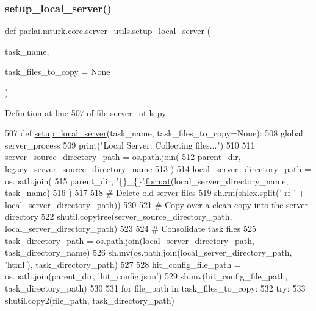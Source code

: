 \subsubsection{\texorpdfstring{setup\+\_\+local\+\_\+server()}{setup\_local\_server()}}
{\footnotesize\ttfamily def parlai.\+mturk.\+core.\+server\+\_\+utils.\+setup\+\_\+local\+\_\+server (\begin{DoxyParamCaption}\item[{}]{task\+\_\+name,  }\item[{}]{task\+\_\+files\+\_\+to\+\_\+copy = {\ttfamily None} }\end{DoxyParamCaption})}



Definition at line 507 of file server\+\_\+utils.\+py.


\begin{DoxyCode}
507 \textcolor{keyword}{def }\hyperlink{namespaceparlai_1_1mturk_1_1core_1_1server__utils_a9d4c4937ea60bd74630a44739e825ebf}{setup\_local\_server}(task\_name, task\_files\_to\_copy=None):
508     \textcolor{keyword}{global} server\_process
509     print(\textcolor{stringliteral}{"Local Server: Collecting files..."})
510 
511     server\_source\_directory\_path = os.path.join(
512         parent\_dir, legacy\_server\_source\_directory\_name
513     )
514     local\_server\_directory\_path = os.path.join(
515         parent\_dir, \textcolor{stringliteral}{'\{\}\_\{\}'}.\hyperlink{namespaceparlai_1_1chat__service_1_1services_1_1messenger_1_1shared__utils_a32e2e2022b824fbaf80c747160b52a76}{format}(local\_server\_directory\_name, task\_name)
516     )
517 
518     \textcolor{comment}{# Delete old server files}
519     sh.rm(shlex.split(\textcolor{stringliteral}{'-rf '} + local\_server\_directory\_path))
520 
521     \textcolor{comment}{# Copy over a clean copy into the server directory}
522     shutil.copytree(server\_source\_directory\_path, local\_server\_directory\_path)
523 
524     \textcolor{comment}{# Consolidate task files}
525     task\_directory\_path = os.path.join(local\_server\_directory\_path, task\_directory\_name)
526     sh.mv(os.path.join(local\_server\_directory\_path, \textcolor{stringliteral}{'html'}), task\_directory\_path)
527 
528     hit\_config\_file\_path = os.path.join(parent\_dir, \textcolor{stringliteral}{'hit\_config.json'})
529     sh.mv(hit\_config\_file\_path, task\_directory\_path)
530 
531     \textcolor{keywordflow}{for} file\_path \textcolor{keywordflow}{in} task\_files\_to\_copy:
532         \textcolor{keywordflow}{try}:
533             shutil.copy2(file\_path, task\_directory\_path)

\end{DoxyCode}
